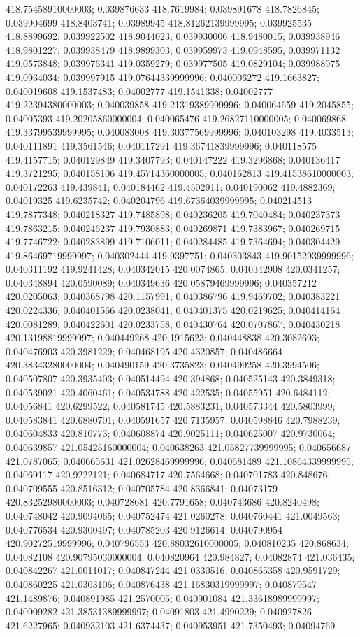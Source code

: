 418.75458910000003; 0.039876633 418.7619984; 0.039891678 418.7826845; 0.039904699 418.8403741; 0.03989945 418.81262139999995; 0.039925535 418.8899692; 0.039922502 418.9044023; 0.039930006 418.9480015; 0.039938946 418.9801227; 0.039938479 418.9899303; 0.039959973 419.0948595; 0.039971132 419.0573848; 0.039976341 419.0359279; 0.039977505 419.0829104; 0.039988975 419.0934034; 0.039997915 419.07644339999996; 0.040006272 419.1663827; 0.040019608 419.1537483; 0.04002777 419.1541338; 0.04002777 419.22394380000003; 0.040039858 419.21319389999996; 0.040064659 419.2045855; 0.04005393 419.20205860000004; 0.040065476 419.26827110000005; 0.040069868 419.33799539999995; 0.040083008 419.30377569999996; 0.040103298 419.4033513; 0.040111891 419.3561546; 0.040117291 419.36741839999996; 0.040118575 419.4157715; 0.040129849 419.3407793; 0.040147222 419.3296868; 0.040136417 419.3721295; 0.040158106 419.45714360000005; 0.040162813 419.41538610000003; 0.040172263 419.439841; 0.040184462 419.4502911; 0.040190062 419.4882369; 0.04019325 419.6235742; 0.040204796 419.67364039999995; 0.040214513 419.7877348; 0.040218327 419.7485898; 0.040236205 419.7040484; 0.040237373 419.7863215; 0.040246237 419.7930883; 0.040269871 419.7383967; 0.040269715 419.7746722; 0.040283899 419.7106011; 0.040284485 419.7364694; 0.040304429 419.86469719999997; 0.040302444 419.9397751; 0.040303843 419.90152939999996; 0.040311192 419.9241428; 0.040342015 420.0074865; 0.040342908 420.0341257; 0.040348894 420.0590089; 0.040349636 420.05879469999996; 0.040357212 420.0205063; 0.040368798 420.1157991; 0.040386796 419.9469702; 0.040383221 420.0224336; 0.040401566 420.0238041; 0.040401375 420.0219625; 0.040414164 420.0081289; 0.040422601 420.0233758; 0.040430764 420.0707867; 0.040430218 420.13198819999997; 0.040449268 420.1915623; 0.040448838 420.3082693; 0.040476903 420.3981229; 0.040468195 420.4320857; 0.040486664 420.38343280000004; 0.040490159 420.3735823; 0.040499258 420.3994506; 0.040507807 420.3935403; 0.040514494 420.394868; 0.040525143 420.3849318; 0.040539021 420.4060461; 0.040534788 420.422535; 0.04055951 420.6484112; 0.04056841 420.6299522; 0.040581745 420.5883231; 0.040573344 420.5803999; 0.040583841 420.6880701; 0.040591657 420.7135957; 0.040598846 420.7988239; 0.040604833 420.810773; 0.040608874 420.9025111; 0.040625007 420.9730064; 0.040639857 421.05425160000004; 0.040638263 421.05827739999995; 0.040656687 421.0787065; 0.040665631 421.02628469999996; 0.040681489 421.10864339999995; 0.04069117 420.9222121; 0.040684717 420.7564668; 0.040701783 420.848676; 0.040709555 420.8516312; 0.040705784 420.8366841; 0.04073179 420.83252980000003; 0.040728681 420.7791658; 0.040743686 420.8240498; 0.040748042 420.9094065; 0.040752474 421.0260278; 0.040760441 421.0049563; 0.040776534 420.9300497; 0.040785203 420.9126614; 0.040790954 420.90272519999996; 0.040796553 420.88032610000005; 0.040810235 420.868634; 0.04082108 420.90795030000004; 0.040820964 420.984827; 0.04082874 421.036435; 0.040842267 421.0011017; 0.040847244 421.0330516; 0.040865358 420.9591729; 0.040860225 421.0303106; 0.040876438 421.16830319999997; 0.040879547 421.1489876; 0.040891985 421.2570005; 0.040901084 421.33618989999997; 0.040909282 421.38531389999997; 0.04091803 421.4990229; 0.040927826 421.6227965; 0.040932103 421.6374437; 0.040953951 421.7350493; 0.04094769 